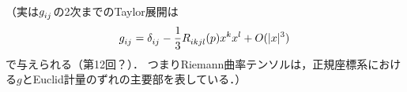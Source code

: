 \documentclass[uplatex,dvipdfmx,fontsize=12pt,jafontsize=11pt,line_length=42zw,number_of_lines=36,hanging_punctuation]{jlreq}
\newcommand{\abs}[1]{\lvert#1\rvert}
\begin{document}
\begin{enumerate-problems}
		（実は$\tensor{g}{_i_j}$の2次までのTaylor展開は
		\begin{equation}
			\tensor{g}{_i_j}=\tensor{\delta}{_i_j}-\frac{1}{3}\tensor{R}{_i_k_j_l}(p)x^kx^l+O(\abs{x}^3)
		\end{equation}
		で与えられる（第12回？）．
		つまりRiemann曲率テンソルは，正規座標系における$g$とEuclid計量のずれの主要部を表している．）
\end{enumerate-problems}
\end{document}
